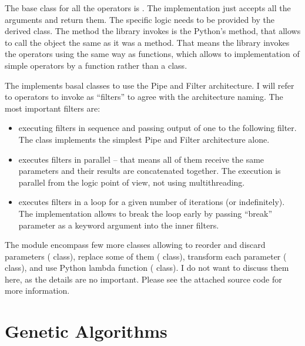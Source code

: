 The base class for all the operators is . The implementation just accepts all the arguments and return them. The specific logic needs to be provided by the derived class. The method the library invokes is the Python's  method, that allows to call the object the same as it was a method. That means the library invokes the operators using the same way as functions, which allows to implementation of simple operators by a function rather than a class.

The  implements basal classes to use the Pipe and Filter architecture. I will refer to operators to invoke as \enquote{filters} to agree with the architecture naming. The most important filters are:
\begin{itemize}
    \item {} executing filters in sequence and passing output of one to the following filter. The  class implements the simplest Pipe and Filter architecture alone.
    \item {} executes filters in parallel -- that means all of them receive the same parameters and their results are concatenated together. The execution is parallel from the logic point of view, not using multithreading.
    \item {} executes filters in a loop for a given number of iterations (or indefinitely). The implementation allows to break the loop early by passing \enquote{break} parameter as a keyword argument into the inner filters.
\end{itemize}
The module encompass few more classes allowing to reorder and discard parameters ( class), replace some of them ( class), transform each parameter ( class), and use Python lambda function ( class). I do not want to discuss them here, as the details are no important. Please see the attached source code for more information.




\section{Genetic Algorithms}

